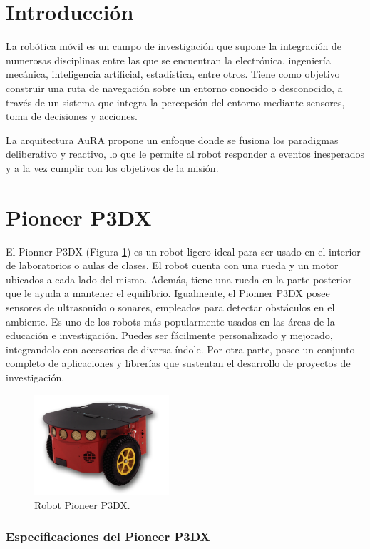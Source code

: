 \documentclass[11pt,twoside,A5]{article}
\newcommand{\reffigure}[1]{Figura \ref{#1}}
\newcommand{\refpfigure}[1]{(\reffigure{#1})}
\begin{document}
\section*{Introducción}

La robótica móvil es un campo de investigación que supone la integración de numerosas disciplinas
entre las que se encuentran la electrónica, ingeniería mecánica,
inteligencia artificial, estadística, entre otros. Tiene como objetivo 
construir una ruta de navegación sobre un entorno conocido o desconocido,
a través de un sistema que integra la percepción del entorno mediante
sensores, toma de decisiones y acciones.

La arquitectura AuRA propone un enfoque donde se fusiona los paradigmas deliberativo y reactivo,
lo que le permite al robot responder a eventos inesperados y a la vez cumplir con los objetivos de la misión.

\section*{Pioneer P3DX}

El Pionner P3DX \refpfigure{fig:pioneer} es un robot ligero ideal para ser usado en el interior de laboratorios o aulas de clases. El robot cuenta con una rueda y un motor ubicados a cada lado del mismo. Además, tiene una rueda en la parte posterior que le ayuda a mantener el equilibrio.
Igualmente, el Pionner P3DX posee sensores de ultrasonido o sonares, empleados para detectar obstáculos en el ambiente.
Es uno de los robots más popularmente usados en las áreas de la educación e investigación. Puedes ser fácilmente personalizado y mejorado, integrandolo con accesorios de diversa índole. Por otra parte, posee un conjunto completo de aplicaciones y librerías que sustentan el desarrollo de proyectos de investigación.

\begin{figure}[here]
	\centering
	\includegraphics[width=5cm]{pioneer.png} 
	\caption{Robot Pioneer P3DX.}
	\label{fig:pioneer}
\end{figure} 

\subsubsection*{Especificaciones del Pioneer P3DX}
\end{document}
